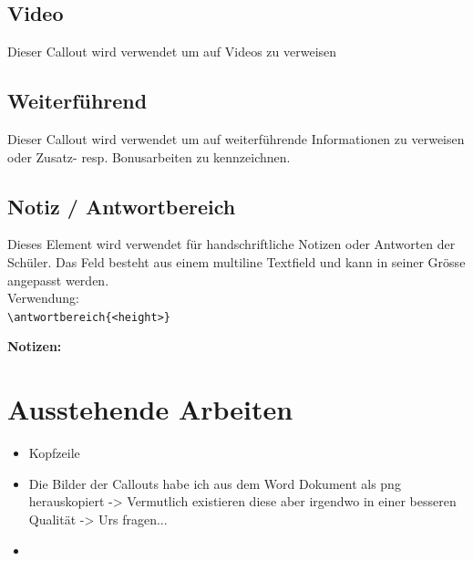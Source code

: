 \subsection{Video}
Dieser Callout wird verwendet um auf Videos zu verweisen
	

\subsection{Weiterführend}
Dieser Callout wird verwendet um auf weiterführende Informationen zu verweisen oder Zusatz- resp. Bonusarbeiten zu kennzeichnen.
	

\subsection{Notiz / Antwortbereich}
Dieses Element wird verwendet für handschriftliche Notizen oder Antworten der Schüler. Das Feld besteht aus einem \flqq multiline Textfield \frqq und kann in seiner Grösse angepasst werden.\\
Verwendung:\\
\lstinline$\antwortbereich{<height>}$

\textbf{Notizen:}\\[0.75ex]
\antwortbereich{100pt}

\blindtext

\newpage
\section{Ausstehende Arbeiten} \label{sec:AusstehendeArbeiten}

\begin{itemize}
	\item Kopfzeile
	\item Die Bilder der Callouts habe ich aus dem Word Dokument als png herauskopiert -> Vermutlich existieren diese aber irgendwo in einer besseren Qualität -> Urs fragen...
	\item 
\end{itemize}


\blindtext[1]

